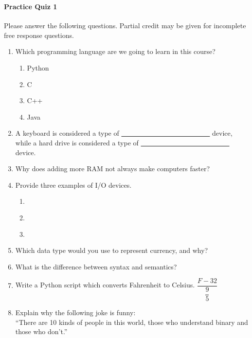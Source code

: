 \documentclass[letter,10pt]{article}
\begin{document}
\huge
\textbf{Practice Quiz 1}
\normalsize

\paragraph{}Please answer the following questions. Partial credit may be given for incomplete free response questions.

\begin{enumerate}
    \item Which programming language are we going to learn in this course?
    \begin{enumerate}
        \item Python
        \item C
        \item C++
        \item Java
    \end{enumerate}
    
    \item A keyboard is considered a type of \underline{~~ ~~ ~~ ~~ ~~ ~~ ~~ ~~ ~~ ~~} device, while a hard drive is considered a type of \underline{~~ ~~ ~~ ~~ ~~ ~~ ~~ ~~ ~~ ~~} device.
    
    \item Why does adding more RAM not always make computers faster?
    
    \item Provide three examples of I/O devices.
    \begin{enumerate}
        \item ~~ ~~
        \item ~~ ~~
        \item ~~ ~~
    \end{enumerate}
    
    \item Which data type would you use to represent currency, and why?
    
    \item What is the difference between syntax and semantics?
    
    \item Write a Python script which converts Fahrenheit to Celsius. $\dfrac{F - 32}{\dfrac{9}{5}}$
    
    \item Explain why the following joke is funny: \\
    ``There are 10 kinds of people in this world, those who understand binary and those who don't.''
    

\end{enumerate}
\end{document}
